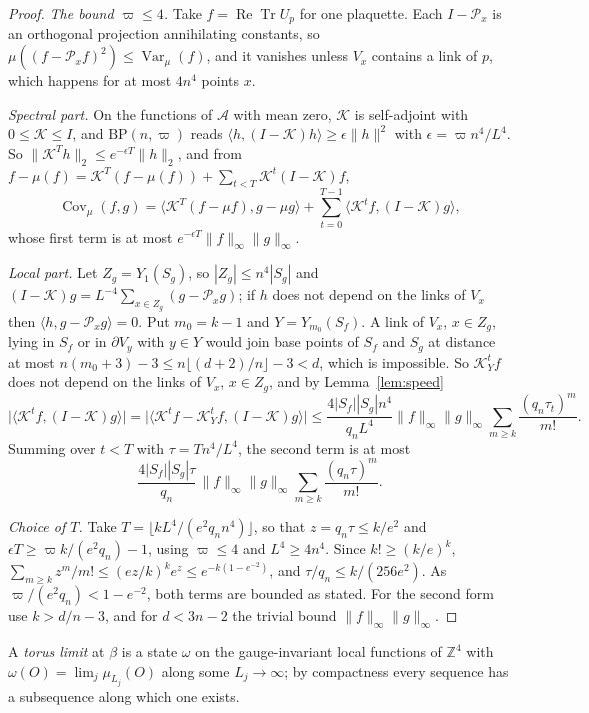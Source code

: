 \documentclass[11pt]{amsart}
\theoremstyle{definition}
\theoremstyle{remark}
\numberwithin{equation}{section}
\newcommand{\Z}{\mathbb{Z}}
\newcommand{\ReTr}{\operatorname{Re}\operatorname{Tr}}
\newcommand{\Cov}{\operatorname{Cov}}
\newcommand{\Var}{\operatorname{Var}}
\newcommand{\ip}[2]{\langle #1,#2\rangle}
\newcommand{\BP}{\mathrm{BP}}
\begin{document}
\begin{proof}
\emph{The bound $\varpi\le4$.} Take $f=\ReTr U_p$ for one plaquette. Each
$I-\mathcal P_x$ is an orthogonal projection annihilating constants, so
$\mu((f-\mathcal P_xf)^2)\le\Var_\mu(f)$, and it vanishes unless $V_x$ contains
a link of $p$, which happens for at most $4n^4$ points $x$.

\emph{Spectral part.} On the functions of $\mathcal A$ with mean zero, $\mathcal K$
is self-adjoint with $0\le\mathcal K\le I$, and $\BP(n,\varpi)$ reads
$\ip h{(I-\mathcal K)h}\ge\epsilon\|h\|^2$ with $\epsilon=\varpi n^4/L^4$. So
$\|\mathcal K^Th\|_2\le e^{-\epsilon T}\|h\|_2$, and from
$f-\mu(f)=\mathcal K^T(f-\mu(f))+\sum_{t<T}\mathcal K^t(I-\mathcal K)f$,
\[
\Cov_\mu(f,g)=\ip{\mathcal K^T(f-\mu f)}{g-\mu g}+\sum_{t=0}^{T-1}
\ip{\mathcal K^tf}{(I-\mathcal K)g},
\]
whose first term is at most $e^{-\epsilon T}\|f\|_\infty\|g\|_\infty$.

\emph{Local part.} Let $Z_g=Y_1(S_g)$, so $|Z_g|\le n^4|S_g|$ and $(I-\mathcal K)g=
L^{-4}\sum_{x\in Z_g}(g-\mathcal P_xg)$; if $h$ does not depend on the links of
$V_x$ then $\ip h{g-\mathcal P_xg}=0$. Put $m_0=k-1$ and $Y=Y_{m_0}(S_f)$. A link
of $V_x$, $x\in Z_g$, lying in $S_f$ or in $\partial V_y$ with $y\in Y$ would join
base points of $S_f$ and $S_g$ at distance at most $n(m_0+3)-3\le n\lfloor
(d+2)/n\rfloor-3<d$, which is impossible. So $\mathcal K_Y^tf$ does not depend on
the links of $V_x$, $x\in Z_g$, and by Lemma~\ref{lem:speed}
\[
\bigl|\ip{\mathcal K^tf}{(I-\mathcal K)g}\bigr|=\bigl|\ip{\mathcal K^tf-\mathcal K_Y^tf}
{(I-\mathcal K)g}\bigr|\le\frac{4|S_f||S_g|n^4}{q_nL^4}\|f\|_\infty\|g\|_\infty
\sum_{m\ge k}\frac{(q_n\tau_t)^m}{m!}.
\]
Summing over $t<T$ with $\tau=Tn^4/L^4$, the second term is at most
\[
\frac{4|S_f||S_g|\tau}{q_n}\,\|f\|_\infty\|g\|_\infty\sum_{m\ge k}
\frac{(q_n\tau)^m}{m!}.
\]

\emph{Choice of $T$.} Take $T=\lfloor kL^4/(e^2q_nn^4)\rfloor$, so that $z=q_n
\tau\le k/e^2$ and $\epsilon T\ge\varpi k/(e^2q_n)-1$, using $\varpi\le4$ and
$L^4\ge4n^4$. Since $k!\ge(k/e)^k$, $\sum_{m\ge k}z^m/m!\le(ez/k)^ke^z\le
e^{-k(1-e^{-2})}$, and $\tau/q_n\le k/(256e^2)$. As $\varpi/(e^2q_n)<1-e^{-2}$,
both terms are bounded as stated. For the second form use $k>d/n-3$, and for
$d<3n-2$ the trivial bound $\|f\|_\infty\|g\|_\infty$.
\end{proof}

A \emph{torus limit} at $\beta$ is a state $\omega$ on the gauge-invariant local
functions of $\Z^4$ with $\omega(O)=\lim_j\mu_{L_j}(O)$ along some $L_j\to\infty$;
by compactness every sequence has a subsequence along which one exists.
\end{document}
